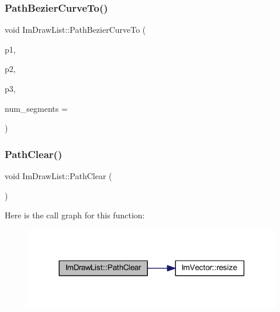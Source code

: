 \mbox{\label{struct_im_draw_list_a495ca7dd4fd5a898e2414658321f4b18}} 
\subsubsection{\texorpdfstring{Path\+Bezier\+Curve\+To()}{PathBezierCurveTo()}}
{\footnotesize\ttfamily void Im\+Draw\+List\+::\+Path\+Bezier\+Curve\+To (\begin{DoxyParamCaption}\item[{const \mbox{\hyperlink{struct_im_vec2}{Im\+Vec2}} \&}]{p1,  }\item[{const \mbox{\hyperlink{struct_im_vec2}{Im\+Vec2}} \&}]{p2,  }\item[{const \mbox{\hyperlink{struct_im_vec2}{Im\+Vec2}} \&}]{p3,  }\item[{int}]{num\+\_\+segments = {} }\end{DoxyParamCaption})}

\mbox{\label{struct_im_draw_list_ae9ad5f4d638b1bfd9383618dc60e3f18}} 
\subsubsection{\texorpdfstring{Path\+Clear()}{PathClear()}}
{\footnotesize\ttfamily void Im\+Draw\+List\+::\+Path\+Clear (\begin{DoxyParamCaption}{ }\end{DoxyParamCaption})\hspace{0.3cm}{\ttfamily [inline]}}

Here is the call graph for this function\+:
\nopagebreak
\begin{figure}[H]
\begin{center}
\leavevmode
\includegraphics[width=317pt]{struct_im_draw_list_ae9ad5f4d638b1bfd9383618dc60e3f18_cgraph}
\end{center}
\end{figure}
\mbox{\label{struct_im_draw_list_aea9301cb99ebf4b27f5d3959017567c9}} 

